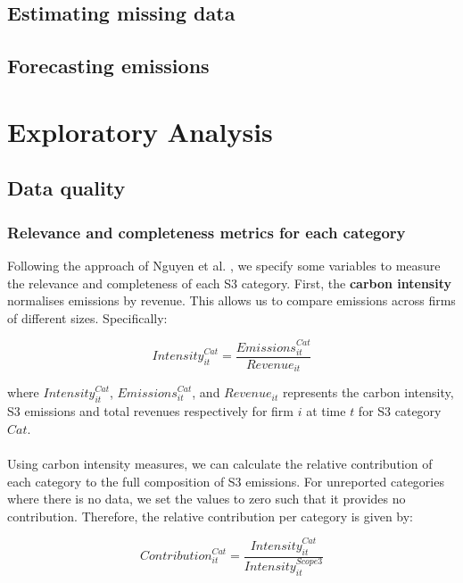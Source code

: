\documentclass[12pt,twoside]{report}
\begin{document}
\section{Estimating missing data}

\section{Forecasting emissions}


\chapter{Exploratory Analysis}\label{sec:ExploratoryAnalysis}


\section{Data quality}
\subsection{Relevance and completeness metrics for each category}\label{sec:RelevanceCompletenessMetrics}

Following the approach of Nguyen et al. \cite{Nguyenetal2023}, we specify some variables to measure the relevance and completeness of each S3 category. First, the \textbf{carbon intensity} normalises emissions by revenue. This allows us to compare emissions across firms of different sizes. Specifically:

\begin{equation}
    \mathit{Intensity}_{it}^{Cat} = \frac{\mathit{Emissions}_{it}^{Cat}}{\mathit{Revenue}_{it}}
\end{equation}

where $\mathit{Intensity}_{it}^{Cat}$, $\mathit{Emissions}_{it}^{Cat}$, and $\mathit{Revenue}_{it}$ represents the carbon intensity, S3 emissions and total revenues respectively for firm $i$ at time $t$ for S3 category $\mathit{Cat}$.
\\\\
Using carbon intensity measures, we can calculate the relative contribution of each category to the full composition of S3 emissions. For unreported categories where there is no data, we set the values to zero such that it provides no contribution. Therefore, the relative contribution per category is given by:

\begin{equation}
    \mathit{Contribution}_{it}^{Cat} = \frac{\mathit{Intensity}_{it}^{Cat}}{\mathit{Intensity}_{it}^{Scope3}}
\end{equation}
\end{document}
